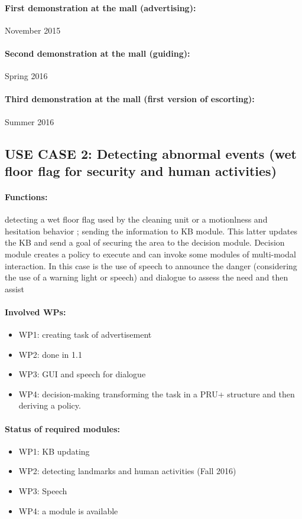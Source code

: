 \documentclass{article}
\begin{document}
\paragraph{\bf First demonstration at the mall (advertising):} November 2015
\paragraph{\bf Second demonstration at the mall (guiding):}  Spring 2016
\paragraph{\bf Third demonstration at the mall (first version of escorting): } Summer 2016

\subsection{USE CASE 2: Detecting abnormal events (wet floor flag for security and human activities)}
\paragraph{\bf Functions:} detecting a wet floor flag used by the cleaning unit or a motionlness and hesitation behavior ;  sending the information to KB module. This latter updates the KB and send a goal of securing the area to the decision module. Decision module creates a policy to execute and can invoke some modules of multi-modal interaction. In this case is the use of speech to announce the danger (considering the use of a warning light or speech) and dialogue to assess the need and then assist
\paragraph{\bf Involved WPs:} 
\begin{itemize} 
\item WP1:  creating task of advertisement
\item WP2: done in 1.1 
\item WP3: GUI and speech for dialogue
\item WP4: decision-making transforming the task in a PRU+ structure and then deriving a policy. 
\end{itemize}
\paragraph{\bf Status of required modules:}
\begin{itemize} 
\item WP1: KB updating
\item WP2: detecting landmarks and human activities (Fall 2016)
\item WP3: Speech 
\item WP4: a module is available
\end{itemize}
\end{document}
